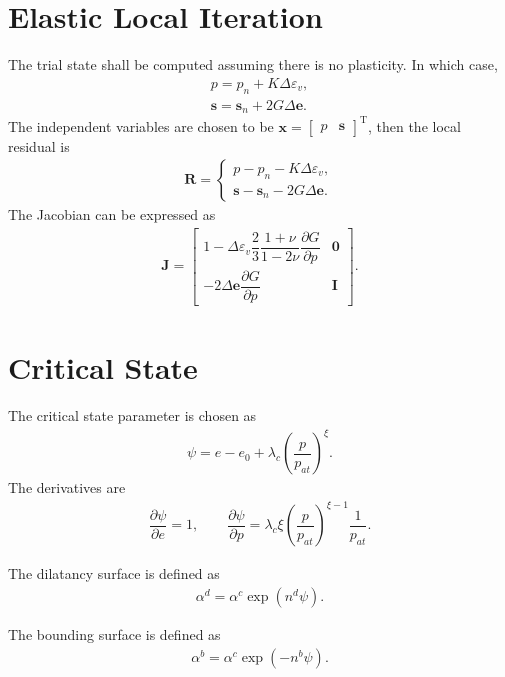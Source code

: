 \documentclass[11pt,a4paper]{article}
\newcommand*{\mT}{\mathrm{T}}
\newcommand*{\pfrac}[2]{\dfrac{\partial#1}{\partial#2}}
\begin{document}
\section{Elastic Local Iteration}
The trial state shall be computed assuming there is no plasticity. In which case,
\begin{gather}
p=p_n+K\Delta\varepsilon_v,\\
\mathbold{s}=\mathbold{s}_n+2G\Delta{}\mathbold{e}.
\end{gather}
The independent variables are chosen to be $\mathbold{x}=\begin{bmatrix}
p&\mathbold{s}
\end{bmatrix}^\mT$, then the local residual is
\begin{gather}
\mathbold{R}=\left\{
\begin{array}{l}
p-p_n-K\Delta\varepsilon_v,\\
\mathbold{s}-\mathbold{s}_n-2G\Delta{}\mathbold{e}.
\end{array}
\right.
\end{gather}
The Jacobian can be expressed as
\begin{gather}
\mathbold{J}=\begin{bmatrix}
1-\Delta\varepsilon_v\dfrac{2}{3}\dfrac{1+\nu}{1-2\nu}\pfrac{G}{p}&\mathbold{0}\\[4mm]
-2\Delta{}\mathbold{e}\pfrac{G}{p}&\mathbf{I}
\end{bmatrix}.
\end{gather}
\section{Critical State}
The critical state parameter is chosen as
\begin{gather}
\psi=e-e_0+\lambda_c\left(\dfrac{p}{p_{at}}\right)^\xi.
\end{gather}
The derivatives are
\begin{gather}
\pfrac{\psi}{e}=1,\qquad
\pfrac{\psi}{p}=\lambda_c\xi\left(\dfrac{p}{p_{at}}\right)^{\xi-1}\dfrac{1}{p_{at}}.
\end{gather}

The dilatancy surface is defined as
\begin{gather}
\alpha^d=\alpha^c\exp\left(n^d\psi\right).
\end{gather}

The bounding surface is defined as
\begin{gather}
\alpha^b=\alpha^c\exp\left(-n^b\psi\right).
\end{gather}
\end{document}
